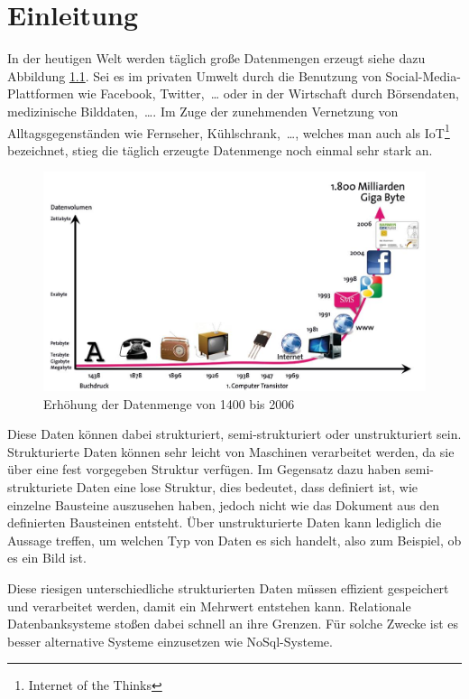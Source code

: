 \chapter{Einleitung}
In der heutigen Welt werden täglich große Datenmengen erzeugt siehe dazu
Abbildung \ref{fig:data-grow}. Sei es im privaten Umwelt durch die Benutzung
von Social-Media-Plattformen wie Facebook, Twitter,~\dots{} oder in der
Wirtschaft durch Börsendaten, medizinische Bilddaten,~\dots . Im Zuge der
zunehmenden Vernetzung von Alltagsgegenständen wie Fernseher,
Kühlschrank,~\dots{}, welches man auch als IoT\footnote{Internet of the Thinks}
bezeichnet, stieg die täglich erzeugte Datenmenge noch einmal sehr stark an.

\begin{figure}
\centering
\includegraphics[scale=0.25]{images/bitkom-lf-bigdata-2012-data_grow.jpg}
\caption{Erhöhung der Datenmenge von 1400 bis 2006 \cite{Weber2012}}
\label{fig:data-grow}
\end{figure}

Diese Daten können dabei strukturiert, semi-strukturiert oder unstrukturiert
sein. Strukturierte Daten können sehr leicht von Maschinen verarbeitet werden,
da sie über eine fest vorgegeben Struktur verfügen. Im Gegensatz dazu haben
semi-strukturiete Daten eine lose Struktur, dies bedeutet, dass definiert ist,
wie einzelne Bausteine auszusehen haben, jedoch nicht wie das Dokument aus den
definierten Bausteinen entsteht. Über unstrukturierte Daten kann lediglich die
Aussage treffen, um welchen Typ von Daten es sich handelt, also zum Beispiel,
ob es ein Bild ist.

Diese riesigen unterschiedliche strukturierten Daten müssen effizient
gespeichert und verarbeitet werden, damit ein Mehrwert entstehen kann.
Relationale Datenbanksysteme stoßen dabei schnell an ihre Grenzen. Für solche
Zwecke ist es besser alternative Systeme einzusetzen wie NoSql-Systeme.

